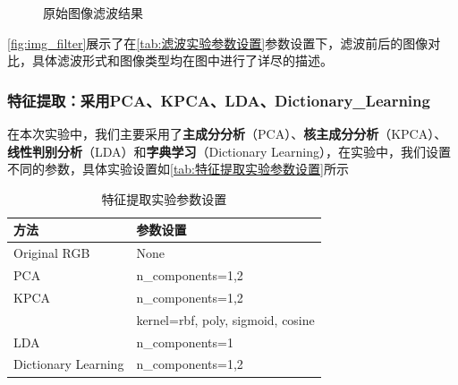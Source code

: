 \documentclass[12pt,hyperref,a4paper,UTF8]{ctexart}
\begin{document}
\begin{figure}[htbp]
{}
\caption{原始图像滤波结果}
\label{fig:img_filter}
\end{figure}

\par

\autoref{fig:img_filter}展示了在\autoref{tab:滤波实验参数设置}参数设置下，滤波前后的图像对比，具体滤波形式和图像类型均在图中进行了详尽的描述。


\subsubsection{特征提取：采用PCA、KPCA、LDA、Dictionary\_Learning}
在本次实验中，我们主要采用了\textbf{主成分分析}（PCA）、\textbf{核主成分分析}（KPCA）、\textbf{线性判别分析}（LDA）和\textbf{字典学习}（Dictionary Learning），在实验中，我们设置不同的参数，具体实验设置如\autoref{tab:特征提取实验参数设置}所示

\begin{table}[!htbp]

\caption{特征提取实验参数设置}
    \centering
    \begin{tabular}{ll}
    \hline
        \textbf{方法} & \textbf{参数设置} \\
        \hline
        Original RGB & None \\
        
        PCA  & n\_components=1,2 \\
        
        KPCA & n\_components=1,2 \\
          & kernel=rbf, poly, sigmoid, cosine \\
          
        LDA  & n\_components=1 \\
        
        Dictionary Learning  & n\_components=1,2 \\
        \hline
    \end{tabular}
    \label{tab:特征提取实验参数设置}
\end{table}
\end{document}
